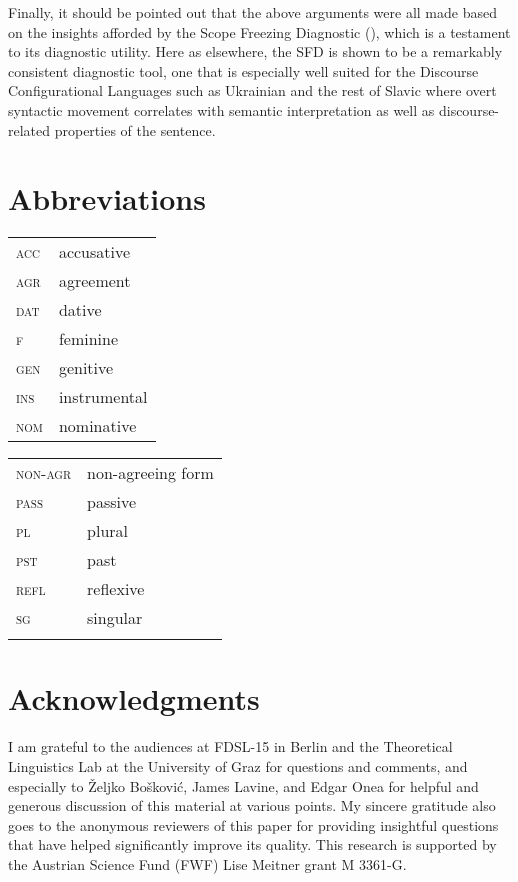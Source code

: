 \documentclass[output=paper,colorlinks,citecolor=brown]{langscibook}
\begin{document}
  Finally, it should be pointed out that the above arguments were all made based on the insights afforded by the Scope Freezing Diagnostic (\citealt{Antonyuk2015,Antonyuk2020, Antonyuk2023, AntonyukUnderReview}), which is a testament to its diagnostic utility. Here as elsewhere, the SFD is shown to be a remarkably consistent diagnostic tool, one that is especially well suited for the Discourse Configurational Languages such as Ukrainian and the rest of Slavic where overt syntactic movement correlates with semantic interpretation as well as discourse-related properties of the sentence.


\section*{Abbreviations}

\begin{tabularx}{.45\textwidth}{lQ}
\textsc{acc} &accusative \\
\textsc{agr} & agreement \\
\textsc{dat} & dative \\
\textsc{f}    & feminine \\
\textsc{gen} & genitive \\             
\textsc{ins} & instrumental               \\
\textsc{nom} & nominative \\
        
\end{tabularx}
\begin{tabularx}{.45\textwidth}{lQ}
\textsc{non-agr} &  non-agreeing form\\
\textsc{pass}   & passive          \\
\textsc{pl}   & plural             \\
\textsc{pst}    &past              \\
\textsc{refl} &   reflexive        \\
\textsc{sg} & singular \\
&\\ %
\end{tabularx}
\section*{Acknowledgments}


I am grateful to the audiences at FDSL-15 in Berlin and the Theoretical Linguistics Lab at the University of Graz for questions and comments, and especially to Željko Bošković, James Lavine, and Edgar Onea for helpful and generous discussion of this material at various points. My sincere gratitude also goes to the anonymous reviewers of this paper for providing insightful questions that have helped significantly improve its quality. This research is supported by the Austrian Science Fund (FWF) Lise Meitner grant M 3361-G.

\printbibliography[heading=subbibliography,notkeyword=this]
\end{document}
